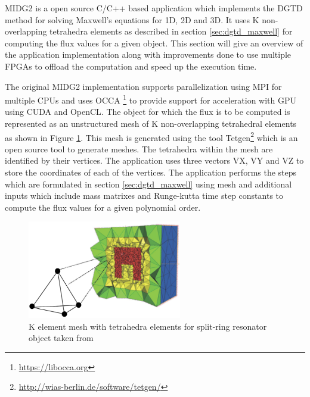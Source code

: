 \ac{MIDG2} is a open source C/C++ based application which implements the \ac{DGTD} method for solving
Maxwell's equations for 1D, 2D and 3D. It uses K non-overlapping tetrahedra elements as described in
section \ref{sec:dgtd_maxwell} for computing the flux values for a given object. This section
will give an overview of the application implementation along with improvements done to use
multiple FPGAs to offload the computation and speed up the execution time.

The original MIDG2 implementation supports parallelization using \ac{MPI} for multiple CPUs and
uses OCCA \footnote{\url{https://libocca.org}} to provide support for acceleration with GPU
using CUDA and OpenCL. The object for which the flux is to be computed is represented as
an unstructured mesh of K non-overlapping tetrahedral elements as shown in Figure \ref{fig:mesh}.
This mesh is generated using the tool Tetgen\footnote{\url{http://wias-berlin.de/software/tetgen/}}
which is an open source tool to generate meshes. The tetrahedra within the mesh are
identified by their vertices. The application uses three vectors VX, VY and VZ
to store the coordinates of each of the vertices. The application performs the steps
which are formulated in section \ref{sec:dgtd_maxwell} using mesh and additional
inputs which include mass matrixes and Runge-kutta time step constants to compute the
flux values for a given polynomial order.
\begin{figure}[h]%
    \centering
    \includegraphics[width=0.6\textwidth]{images/mesh}
    \caption{K element mesh with tetrahedra elements for split-ring resonator object taken from \cite{forstner_discontinuous_nodate}}
    \label{fig:mesh}
\end{figure}

